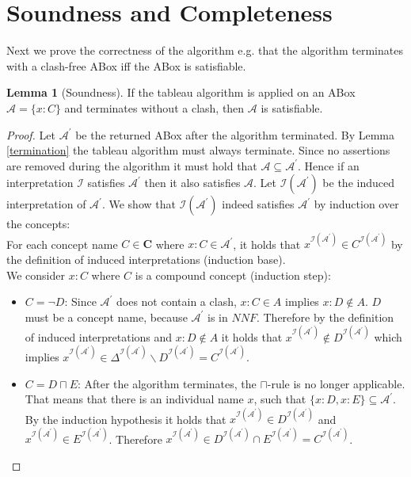 \documentclass{book}
\theoremstyle{break}
\theoremstyle{definition}
\newtheorem{mylem}{Lemma}
\begin{document}
\section{Soundness and Completeness}
Next we prove the correctness of the algorithm e.g. that the algorithm terminates with a clash-free ABox iff the ABox is satisfiable.
\begin{mylem}[Soundness]
If the tableau algorithm is applied on an ABox $\mathcal{A}=\{x:C\}$ and  terminates without a clash, then $\mathcal{A}$ is satisfiable.
\end{mylem}
\begin{proof}
Let $\mathcal{A}^\prime$ be the returned ABox after the algorithm terminated. By Lemma \ref{termination} the tableau algorithm must always terminate. Since no assertions are removed during the algorithm it must hold that $\mathcal{A}\subseteq\mathcal{A}^\prime$. Hence if an interpretation $\mathcal{I}$ satisfies $\mathcal{A}^\prime$ then it also satisfies $\mathcal{A}$. Let $\mathcal{I}(\mathcal{A}^\prime)$ be the induced interpretation of $\mathcal{A}^\prime$. We show that $\mathcal{I}(\mathcal{A}^\prime)$ indeed satisfies $\mathcal{A}^\prime$ by induction over the concepts:\\
For each concept name $C\in\mathbf{C}$ where $x:C\in\mathcal{A}^\prime$, it holds that $x^{\mathcal{I}(\mathcal{A}^\prime)}\in C^{\mathcal{I}(\mathcal{A}^\prime)}$ by the definition of induced interpretations (induction base).\\
We consider $x:C$ where $C$ is a compound concept (induction step):
\begin{itemize}
\item $C=\neg D$: Since $\mathcal{A}^\prime$ does not contain a clash, $x:C\in A$ implies $x:D\notin A$. $D$ must be a concept name, because $\mathcal{A}^\prime$ is in $NNF$. Therefore by the definition of induced interpretations and $x:D\notin A$ it holds that $x^{\mathcal{I}(\mathcal{A}^\prime)}\notin D^{\mathcal{I}(\mathcal{A}^\prime)}$ which implies $x^{\mathcal{I}(\mathcal{A}^\prime)}\in \Delta^{\mathcal{I}(\mathcal{A}^\prime)}\backslash D^{\mathcal{I}(\mathcal{A}^\prime)}=C^{\mathcal{I}(\mathcal{A}^\prime)}$.
\item $C=D\sqcap E$: After the algorithm terminates, the $\sqcap$-rule is no longer applicable. That means that there is an individual name $x$, such that $\{x:D, x:E\}\subseteq \mathcal{A}^\prime$. By the induction hypothesis it holds that $x^{\mathcal{I}(\mathcal{A}^\prime)}\in D^{\mathcal{I}(\mathcal{A}^\prime)}$ and $x^{\mathcal{I}(\mathcal{A}^\prime)}\in E^{\mathcal{I}(\mathcal{A}^\prime)}$. Therefore $x^{\mathcal{I}(\mathcal{A}^\prime)}\in D^{\mathcal{I}(\mathcal{A}^\prime)}\cap E^{\mathcal{I}(\mathcal{A}^\prime)}=C^{\mathcal{I}(\mathcal{A}^\prime)}$.

\end{itemize}
\end{proof}
\end{document}
